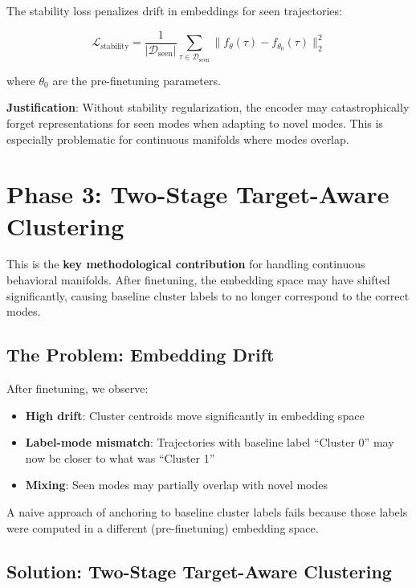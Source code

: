 \documentclass{article}
\begin{document}
The stability loss penalizes drift in embeddings for seen trajectories:

\begin{equation}
    \mathcal{L}_{\text{stability}} = \frac{1}{|\mathcal{D}_{\text{seen}}|} \sum_{\tau \in \mathcal{D}_{\text{seen}}} \|f_\theta(\tau) - f_{\theta_0}(\tau)\|_2^2
\end{equation}

where $\theta_0$ are the pre-finetuning parameters.

\textbf{Justification}: Without stability regularization, the encoder may catastrophically forget representations for seen modes when adapting to novel modes. This is especially problematic for continuous manifolds where modes overlap.

\section{Phase 3: Two-Stage Target-Aware Clustering}

This is the \textbf{key methodological contribution} for handling continuous behavioral manifolds. After finetuning, the embedding space may have shifted significantly, causing baseline cluster labels to no longer correspond to the correct modes.

\subsection{The Problem: Embedding Drift}

After finetuning, we observe:
\begin{itemize}
    \item \textbf{High drift}: Cluster centroids move significantly in embedding space
    \item \textbf{Label-mode mismatch}: Trajectories with baseline label ``Cluster 0'' may now be closer to what was ``Cluster 1''
    \item \textbf{Mixing}: Seen modes may partially overlap with novel modes
\end{itemize}

A naive approach of anchoring to baseline cluster labels fails because those labels were computed in a different (pre-finetuning) embedding space.

\subsection{Solution: Two-Stage Target-Aware Clustering}
\end{document}
